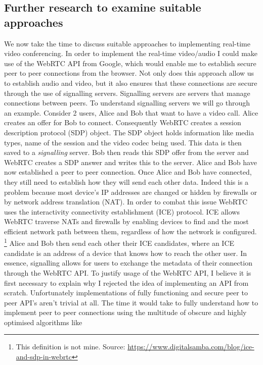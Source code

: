 \subsection{Further research to examine suitable approaches}
\label{sec:further}

We now take the time to discuss suitable approaches to
implementing real-time video conferencing. In
order to implement the real-time video/audio I could make use
of the WebRTC API from Google, which would enable me to
establish secure peer to peer connections from the browser.
Not only does this approach allow us to establish audio and
video, but it also ensures that these connections are secure
through the use of signalling servers. Signalling servers are
servers that manage connections between peers. To understand
signalling servers we will go through an example. Consider 2
users, Alice and Bob that want to have a video call. Alice
creates an offer for Bob to connect. Consequently WebRTC
creates a session description protocol (SDP) object. The SDP
object holds information like media types, name of the
session and the video codec being used.  This data is then
saved to a \textit{signalling} server. Bob then reads this SDP
offer from the server and WebRTC creates a SDP answer and
writes this to the server. Alice and Bob have now established
a peer to peer connection. Once Alice and Bob have connected,
they still need to establish how they will send each other data.
Indeed this is a problem because most device's IP addresses are
changed or hidden by firewalls or by network address translation
(NAT). In order to combat this issue WebRTC uses the interactivity
connectivity establishment (ICE) protocol. ICE allows WebRTC
traverse NATs and firewalls by enabling devices to find and
the most efficient network path between them, regardless of
how the network is configured. \footnote{This definition is not mine.
Source: \url{https://www.digitalsamba.com/blog/ice-and-sdp-in-webrtc}}
Alice and Bob then send each other their ICE candidates, where an ICE
candidate is an address of a device that knows how to reach the
other user. In essence, signalling allows for
users to exchange the metadata of their connection through the
WebRTC API. To justify usage of the WebRTC API, I believe it
is first necessary to explain why I rejected the idea of
implementing an API from scratch. Unfortunately
implementations of fully functioning and secure peer to peer
API's aren't trivial at all. The time it would take to fully
understand how to implement peer to peer connections using the
multitude of obscure and highly optimised algorithms like
